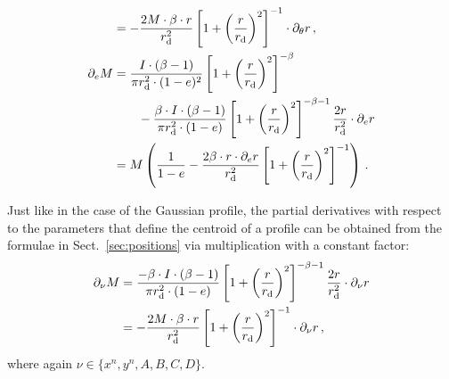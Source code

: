 \begin{align}
 &= -\frac{2M\cdot\beta\cdot r}{r_\text{d}^2}\left[1+\left(\frac{r}{r_\text{d}}\right)^2\right]^{-1}\cdot\partial_\theta r\,,\\
 \partial_e M &= \frac{I\cdot(\beta-1)}{\pi r_\text{d}^2\cdot(1-e)^2}\left[1+\left(\frac{r}{r_\text{d}}\right)^2\right]^{-\beta} \nonumber\\
 &\qquad - \frac{\beta\cdot I\cdot(\beta-1)}{\pi r_\text{d}^2\cdot(1-e)}\left[1+\left(\frac{r}{r_\text{d}}\right)^2\right]^{-\beta-1}\frac{2r}{r_\text{d}^2}\cdot\partial_e r \nonumber \\
 &= M\left(\frac{1}{1-e} - \frac{2\beta\cdot r\cdot\partial_e r}{r_\text{d}^2}\left[1+\left(\frac{r}{r_\text{d}}\right)^2\right]^{-1} \right)\,.
\end{align}

Just like in the case of the Gaussian profile, the partial derivatives with respect to the parameters that define the centroid of a profile can be obtained from the formulae in Sect.~\ref{sec:positions} via multiplication with a constant factor:
%
\begin{align}
  \partial_\nu M &= \frac{-\beta\cdot I\cdot(\beta-1)}{\pi r_\text{d}^2\cdot(1-e)}\left[1+\left(\frac{r}{r_\text{d}}\right)^2\right]^{-\beta-1}\frac{2r}{r_\text{d}^2}\cdot\partial_\nu r \nonumber \\
 &= -\frac{2M\cdot\beta\cdot r}{r_\text{d}^2}\left[1+\left(\frac{r}{r_\text{d}}\right)^2\right]^{-1}\cdot  \partial_\nu r\,,
\end{align}
where again $\nu \in \{x^n, y^n, A, B, C, D\}$.


